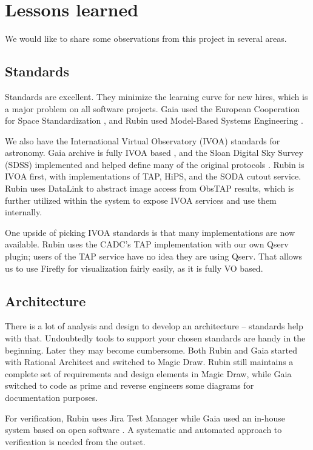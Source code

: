 \documentclass[11pt,twoside]{article}
\begin{document}
\section{Lessons learned}
We would like to share some observations from this project in several areas.
\subsection{Standards}
Standards are excellent. They minimize the learning curve for new hires, which is a major problem on all software projects.
Gaia used the European Cooperation for Space Standardization \citep[ECSS;][]{2008ASPC..394..191O}, and
 Rubin used Model-Based Systems Engineering \citep[MBSE;][]{2018SPIE10705E..0US}.

We also have the International Virtual Observatory (IVOA) standards for astronomy. Gaia archive is fully IVOA based \citep{2019ASPC..523..445S,2015scop.confE...8G}, and the Sloan Digital Sky Survey (SDSS) implemented and helped define many of the original protocols \citep{2005ASPC..347..684T}.
Rubin is IVOA first, with implementations of TAP, HiPS, and the SODA cutout service.
Rubin uses DataLink to abstract image access from ObsTAP results, which is further utilized within the system to expose IVOA services and use them internally.

One upside of picking IVOA standards is that many implementations are now available.
Rubin uses the CADC's TAP implementation with our own Qserv plugin; users of the TAP service have no idea they are using Qserv.
That allows us to use Firefly for visualization fairly easily, as it is
fully VO based.

\subsection{Architecture}
There is a lot of analysis and design to develop an architecture -- standards help with that.
Undoubtedly tools to support your chosen standards are handy in the beginning. Later they may become cumbersome. Both Rubin and Gaia started with Rational Architect and switched to Magic Draw.
Rubin still maintains a complete set of requirements and design elements in Magic Draw, while Gaia switched to code as prime and reverse engineers some diagrams for documentation purposes.

For verification, Rubin uses Jira Test Manager \citep{2018SPIE10705E..0US} while Gaia used an in-house system based on open software \citep{2012SPIE.8449E..0GC}.
A systematic and automated approach to verification is needed from the outset.
\end{document}
